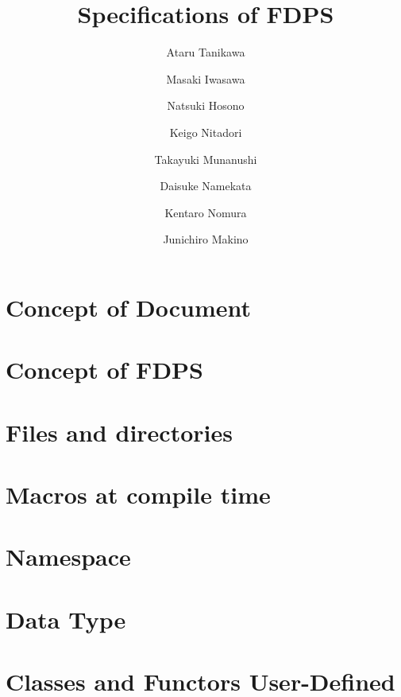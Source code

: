 \documentclass[12pt,a4paper,dvipdfmx]{article}
\title{Specifications of FDPS}
\author{Ataru Tanikawa}
\author{Masaki Iwasawa}
\author{Natsuki Hosono}
\author{Keigo Nitadori}
\author{Takayuki Munanushi}
\author{Daisuke Namekata}
\author{Kentaro Nomura}
\author{Junichiro Makino}
\affil{Particle Simulator Research Team, R-CCS, RIKEN}
\date{}
\begin{document}
\maketitle
\tableofcontents
\newpage

\section{Concept of Document}

\newpage

\section{Concept of FDPS}
\label{sec:overview}

\newpage

\section{Files and directories}
\label{sec:configuration}

\newpage

\section{Macros at compile time}
\label{sec:compile}

\newpage

\section{Namespace}
\label{sec:namespace}

\newpage

\section{Data Type}
\label{sec:datatype}

\newpage

\section{Classes and Functors User-Defined}
\label{sec:userdefined}

\newpage
\end{document}
